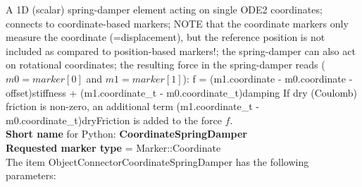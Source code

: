 A 1D (scalar) spring-damper element acting on single ODE2 coordinates; connects to coordinate-based markers; NOTE that the coordinate markers only measure the coordinate (=displacement), but the reference position is not included as compared to position-based markers!; the spring-damper can also act on rotational coordinates; the resulting force in the spring-damper reads ($m0 = marker[0]$ and $m1 = marker[1]$): \be f = (m1.coordinate - m0.coordinate - offset)\cdot stiffness + (m1.coordinate_t - m0.coordinate_t)\cdot damping \ee If dry (Coulomb) friction is non-zero, an additional term \be {}(m1.coordinate_t - m0.coordinate_t)\cdot dryFriction \ee is added to the force $f$.
 \\
{\bf Short name} for Python: {\bf CoordinateSpringDamper}
 \\  {\bf Requested marker type} = Marker::Coordinate \\ 
The item ObjectConnectorCoordinateSpringDamper has the following parameters:

